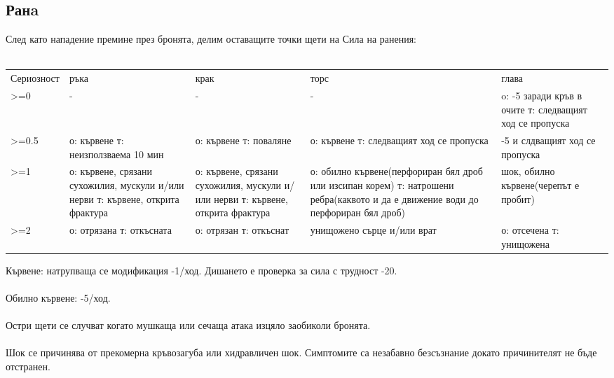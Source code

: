  
\subsection{Ранa}
След като нападение премине през бронята, делим оставащите точки щети на Сила на ранения:
\\
\\
\begin{tabular}{ p{3cm} | p{3cm} | p{3cm} | p{3cm} | p{3cm} }
Сериозност & ръка                                                                             & крак                                                                            & торс                                     & глава                                                   \\
>=0        & -                                                                                & -                                                                               & -                                        & o: -5 заради кръв в очите т: следващият ход се пропуска \\
>=0.5      & о: кървене т: неизползваема 10 мин                                               & о: кървене т: поваляне                                                          & о: кървене т: следващият ход се пропуска & -5 и слдващият ход се пропуска     \\
>=1        & о: кървене, срязани сухожилия, мускули и/или нерви т: кървене, открита фрактура  & о: кървене, срязани сухожилия, мускули и/или нерви т: кървене, открита фрактура & о: обилно кървене(перфориран бял дроб или изсипан корем) т: натрошени ребра(каквото и да е движение води до перфориран бял дроб)                 & шок, обилно кървене(черепът е пробит) \\
>=2        & о: отрязана т: откъсната                                                         & о: отрязан т: откъснат                                                          & унищожено сърце и/или врат                                                       & о: отсечена т: унищожена \\
\end{tabular}

\noindent
Кървене: натрупваща се модификация -1/ход.
Дишането е проверка за сила с трудност -20.
\\
\\
Обилно кървене: -5/ход.
\\
\\
Остри щети се случват когато мушкаща или сечаща атака изцяло заобиколи бронята.
\\
\\
Шок се причинява от прекомерна кръвозагуба или хидравличен шок.
Симптомите са незабавно безсъзнание докато причинителят не бъде отстранен.



